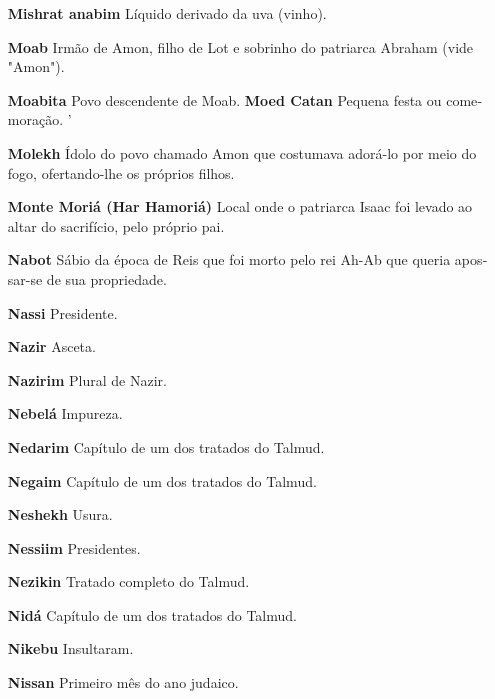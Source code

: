 \begin{itemize}
\item[\textbf{Mishrat anabim}] Líquido derivado da uva (vinho).

\item[\textbf{Moab}] Irmão de Amon, filho de Lot e sobrinho do patriarca
Abraham (vi­de "Amon").

\item[\textbf{Moabita} Povo descendente de Moab. \textbf{Moed Catan}]
Pequena festa ou come­moração. '

\item[\textbf{Molekh}] Ídolo do povo chamado Amon que costumava adorá-lo por
meio do fogo, ofertando-lhe os pró­prios filhos.

\item[\textbf{Monte Moriá (Har Hamoriá)}] Local onde o patriarca Isaac foi
levado ao al­tar do sacrifício, pelo próprio pai.

\item[\textbf{Nabot}] Sábio da época de Reis que foi morto pelo rei Ah-Ab que
queria apos­sar-se de sua propriedade.

\item[\textbf{Nassi}] Presidente.

\item[\textbf{Nazir}] Asceta.

\item[\textbf{Nazirim}] Plural de Nazir.

\item[\textbf{Nebelá}] Impureza.

\item[\textbf{Nedarim}] Capítulo de um dos trata­dos do Talmud.

\item[\textbf{Negaim}] Capítulo de um dos tratados do Talmud.

\item[\textbf{Neshekh}] Usura.

\item[\textbf{Nessiim}] Presidentes.

\item[\textbf{Nezikin}] Tratado completo do Tal­mud.

\item[\textbf{Nidá}] Capítulo de um dos tratados do Talmud.

\item[\textbf{Nikebu}] Insultaram.

\item[\textbf{Nissan}] Primeiro mês do ano judai­co.


\end{itemize}
